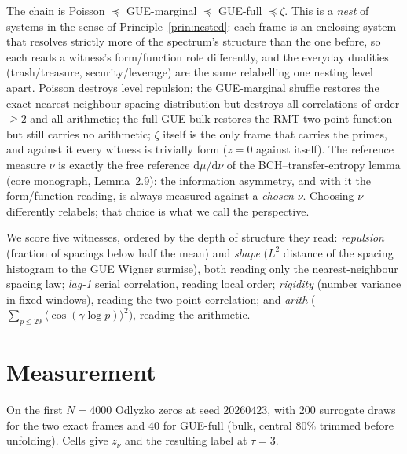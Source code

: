 \documentclass[11pt]{article}
\theoremstyle{definition}
\theoremstyle{plain}
\begin{document}
\noindent The chain is Poisson $\preceq$ GUE-marginal $\preceq$ GUE-full $\preceq \zeta$. This is a \emph{nest} of systems in the sense of Principle~\ref{prin:nested}: each frame is an enclosing system that resolves strictly more of the spectrum's structure than the one before, so each reads a witness's form/function role differently, and the everyday dualities (trash/treasure, security/leverage) are the same relabelling one nesting level apart. Poisson destroys level repulsion; the GUE-marginal shuffle restores the exact nearest-neighbour spacing distribution but destroys all correlations of order $\ge2$ and all arithmetic; the full-GUE bulk restores the RMT two-point function but still carries no arithmetic; $\zeta$ itself is the only frame that carries the primes, and against it every witness is trivially form ($z=0$ against itself). The reference measure $\nu$ is exactly the free reference $\mathrm{d}\mu/\mathrm{d}\nu$ of the BCH--transfer-entropy lemma (core monograph, Lemma~2.9): the information asymmetry, and with it the form/function reading, is always measured against a \emph{chosen} $\nu$. Choosing $\nu$ differently relabels; that choice is what we call the perspective.

We score five witnesses, ordered by the depth of structure they read: \emph{repulsion} (fraction of spacings below half the mean) and \emph{shape} ($L^2$ distance of the spacing histogram to the GUE Wigner surmise), both reading only the nearest-neighbour spacing law; \emph{lag-1} serial correlation, reading local order; \emph{rigidity} (number variance in fixed windows), reading the two-point correlation; and \emph{arith} ($\sum_{p\le 29}\langle\cos(\gamma\log p)\rangle^2$), reading the arithmetic.

\section{Measurement}\label{sec:meas}

On the first $N=4000$ Odlyzko zeros at seed $20260423$, with $200$ surrogate draws for the two exact frames and $40$ for GUE-full (bulk, central $80\%$ trimmed before unfolding). Cells give $z_\nu$ and the resulting label at $\tau=3$.
\end{document}
